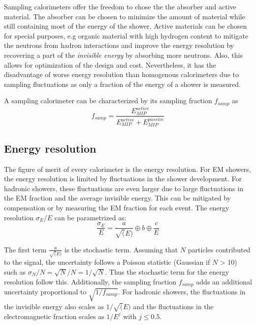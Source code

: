 Sampling calorimeters offer the freedom to chose the the absorber and active material. The absorber can be chosen to minimize the amount of material while still containing most of the energy of the shower. Active materials can be chosen for special purposes, e.g organic material with high hydrogen content to mitigate the neutrons from hadron interactions and improve the energy resolution by recovering a part of the \textit{invisible energy} by absorbing more neutrons. Also, this allows for optimization of the design and cost. Nevertheless, it has the disadvantage of worse energy resolution than homogenous calorimeters due to sampling fluctuations as only a fraction of the energy of a shower is measured.

A sampling calorimeter can be characterized by its sampling fraction $f_{samp}$ as
\begin{equation}
  f_{samp} = \frac{E_{MIP}^{active}}{E_{MIP}^{active} + E_{MIP}^{passive}}
\end{equation}

\subsection{Energy resolution}
\label{subsec:EnergyReso}

The figure of merit of every calorimeter is the energy resolution. For EM showers, the energy resolution is limited by fluctuations in the shower development. For hadronic showers, these fluctuations are even larger due to large fluctuations in the EM fraction and the average invisible energy. This can be mitigated by compensation or by measuring the EM fraction for each event.
The energy resolution $\sigma_E/E$ can be parametrized as:
\begin{equation}
  \frac{\sigma_E}{E} = \frac{a}{\sqrt(E)} \oplus b \oplus \frac{c}{E}
\end{equation}

The first term $\frac{a}{\sqrt(E)}$ is the stochastic term. Assuming that $N$ particles contributed to the signal, the uncertainty follows a Poisson statistic (Gaussian if $N$ > 10) such as $\sigma_N/N = \sqrt{N}/N = 1/\sqrt{N}$. Thus the stochastic term for the energy resolution follow this. Additionally, the sampling fraction $f_{samp}$ adds an additional uncertainty proportional to $\sqrt{1/f_{samp}}$. For hadronic showers, the fluctuations in the invisible energy also scales as $1/\sqrt(E)$ and the fluctuations in the electromagnetic fraction scales as $1/E^j$ with $j \leq 0.5$.

